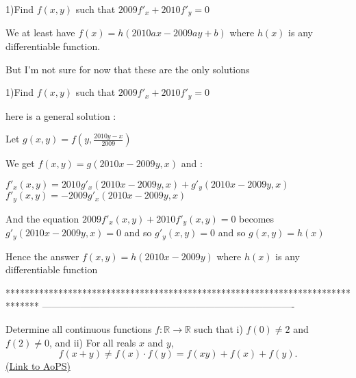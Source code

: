 \begin{solution}
	\begin{tcolorbox}1)Find $ f(x,y)$ such that $ 2009 f'_{x} + 2010 f'_{y} = 0$\end{tcolorbox}

We at least have $ f(x)=h(2010ax-2009ay+b)$ where $ h(x)$ is any differentiable function.

But I'm not sure for now that these are the only solutions
\end{solution}



\begin{solution}
	\begin{tcolorbox}1)Find $ f(x,y)$ such that $ 2009 f'_{x} + 2010 f'_{y} = 0$\end{tcolorbox}

here is a general solution :

Let $ g(x,y)=f(y,\frac{2010y-x}{2009})$

We get $ f(x,y)=g(2010x-2009y,x)$ and :

$ f'_x(x,y)=2010g'_x(2010x-2009y,x)+g'_y(2010x-2009y,x)$
$ f'_y(x,y)=-2009g'_x(2010x-2009y,x)$

And the equation $ 2009f'_x(x,y)+2010f'_y(x,y)=0$ becomes $ g'_y(2010x-2009y,x)=0$ and so $ g'_y(x,y)=0$ and so $ g(x,y)=h(x)$ 

Hence the answer $ \boxed{f(x,y)=h(2010x-2009y)}$ where $ h(x)$ is any differentiable function
\end{solution}
*******************************************************************************
-------------------------------------------------------------------------------

\begin{problem}
	Determine all continuous functions $f: \mathbb R \to \mathbb R$ such that
i) $ f(0) \ne 2$ and $f(2) \ne 0$, and
ii) For all reals $x$ and $y$, \[ f(x+y) \ne f(x) \cdot f(y) =f(xy)+f(x)+f(y).\]
	\flushright \href{https://artofproblemsolving.com/community/c6h321703}{(Link to AoPS)}
\end{problem}



